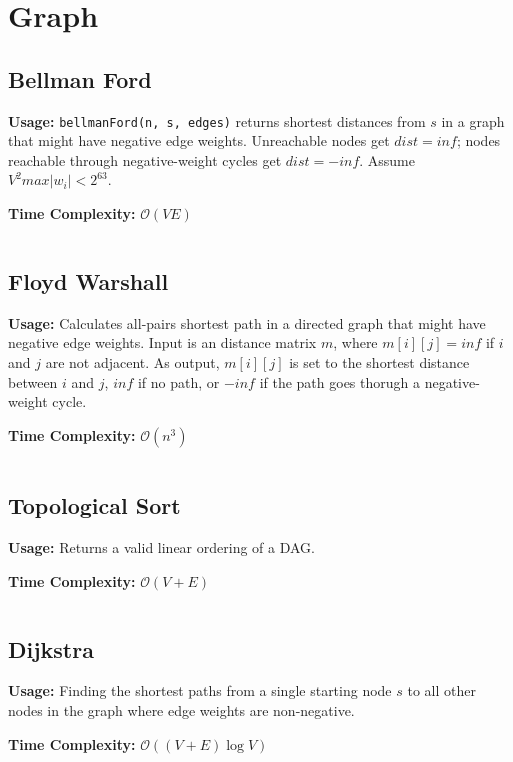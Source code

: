 
\section{Graph}
  \subsection{Bellman Ford}
    \par \textbf{Usage:} \texttt{bellmanFord(n, s, edges)} returns shortest distances from $s$ in a graph that might have negative edge weights.
    Unreachable nodes get $dist = inf$; nodes reachable through negative-weight cycles get $dist = -inf$.
    Assume $V^2 max|w_i| < 2^{63}$.
    \par \textbf{Time Complexity:} $\mathcal{O}(VE)$
    \inputminted{cpp}{library/graphs/bellman_ford.cpp}

  \subsection{Floyd Warshall}
    \par \textbf{Usage:} Calculates all-pairs shortest path in a directed graph that might have negative edge weights.
    Input is an distance matrix $m$, where $m[i][j] = inf$ if $i$ and $j$ are not adjacent.
    As output, $m[i][j]$ is set to the shortest distance between $i$ and $j$, $inf$ if no path, or $-inf$ if the path goes thorugh a negative-weight cycle.
    \par \textbf{Time Complexity:} $\mathcal{O}(n^3)$
    \inputminted{cpp}{library/graphs/floyd_warshall.cpp}

  \subsection{Topological Sort}
    \par \textbf{Usage:} Returns a valid linear ordering of a DAG.
    \par \textbf{Time Complexity:} $\mathcal{O}(V + E)$
    \inputminted{cpp}{library/graphs/topo_sort.cpp}

  \subsection{Dijkstra}
    \par \textbf{Usage:} Finding the shortest paths from a single starting node $s$ to all other nodes in the graph where edge weights are non-negative.
    \par \textbf{Time Complexity:} $\mathcal{O}((V + E)\log V)$
    \inputminted{cpp}{library/graphs/dijkstra.cpp}

